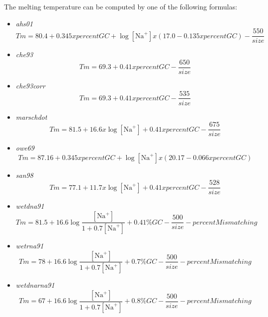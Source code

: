 \documentclass{article}
\begin{document}
The melting temperature can be computed by one of the following formulas:   
\begin{itemize}
\item \textit{ahs01}
\begin{displaymath}
Tm = 80.4 + 0.345 x percentGC + \log[\mbox{Na}^+] x (17.0 - 0.135 x percentGC) - \frac{550}{size}
\end{displaymath}
\item \textit{che93}
\begin{displaymath}
Tm = 69.3 + 0.41 x percentGC - \frac{650}{size}
\end{displaymath}
\item \textit{che93corr}
\begin{displaymath}
Tm = 69.3 + 0.41 x percentGC - \frac{535}{size}
\end{displaymath}
\item \textit{marschdot}
\begin{displaymath}
Tm = 81.5 + 16.6 x \log[\mbox{Na}^+] + 0.41 x percentGC - \frac{675}{size}
\end{displaymath}
\item \textit{owe69}
\begin{displaymath}
Tm = 87.16 + 0.345 x percentGC + \log[\mbox{Na}^+] x (20.17 - 0.066 x percentGC)
\end{displaymath}
\item \textit{san98}
\begin{displaymath}
Tm = 77.1 + 11.7 x \log[\mbox{Na}^+] + 0.41 x percentGC - \frac{528}{size}
\end{displaymath}
\item \textit{wetdna91}
\begin{displaymath}
Tm = 81.5 + 16.6\log\frac{[\mbox{Na}^+]}{1+0.7[\mbox{Na}^+]} + 0.41\% GC - \frac{500}{size} 
- percentMismatching
\end{displaymath}
\item \textit{wetrna91}
\begin{displaymath}
Tm = 78 + 16.6\log\frac{[\mbox{Na}^+]}{1+0.7[\mbox{Na}^+]} + 0.7\% GC - \frac{500}{size}
- percentMismatching
\end{displaymath}
\item \textit{wetdnarna91}
\begin{displaymath}
Tm = 67 + 16.6\log\frac{[\mbox{Na}^+]}{1+0.7[\mbox{Na}^+]} + 0.8\% GC - \frac{500}{size}
- percentMismatching
\end{displaymath}
\end{itemize}
\end{document}

